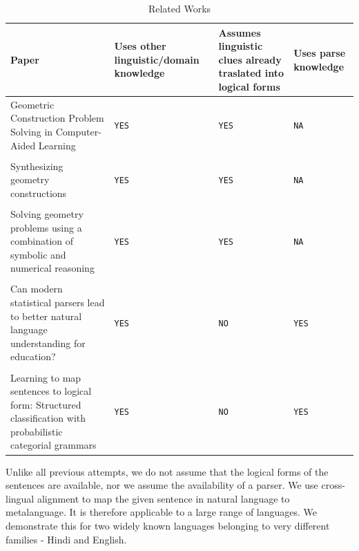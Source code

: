 \def\DevnagVersion{2.15}\documentclass[12pt]{article}
\begin{document}
\begin{table}[H]
\smallskip
\begin{center}
\begin{tabular}{p{}p{}p{}p{}}
\hline
\bf{\small Paper} & \bf{\small Uses other linguistic/domain knowledge} & \bf{\small Assumes linguistic clues already traslated into logical forms} & \bf{\small Uses parse knowledge}\\[0.2cm]\hline
Geometric Construction Problem Solving in Computer-Aided Learning\cite{schreck2012geometric} & \texttt{YES} & \texttt{YES} & \texttt{NA}\\\\
Synthesizing geometry constructions\cite{gulwani2011synthesizing} & \texttt{YES} & \texttt{YES} & \texttt{NA}\\\\
Solving geometry problems using a combination of symbolic and numerical reasoning\cite{itzhaky2012solving} & \texttt{YES} & \texttt{YES} & \texttt{NA}\\\\
Can modern statistical parsers lead to better natural language understanding for education?\cite{ahmed2012can} & \texttt{YES} & \texttt{NO} & \texttt{YES}\\\\
Learning to map sentences to logical form: Structured classification with probabilistic categorial grammars\cite{zettlemoyer2012learning} & \texttt{YES} & \texttt{NO} & \texttt{YES}\\
\hline
\end{tabular}
\caption{Related Works}
\end{center}
\end{table}

Unlike all previous attempts, we do not assume that the logical forms of the sentences are available, nor we assume the availability of a parser. We use cross-lingual alignment to map the given sentence in natural language to metalanguage. It is therefore applicable to a large range of languages. We demonstrate this for two widely known languages belonging to very different families - Hindi and English.
\end{document}
